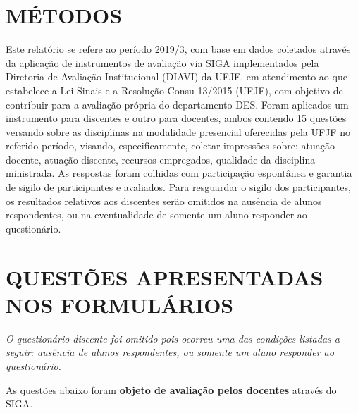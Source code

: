 \documentclass[a4paper,10pt]{article}
\begin{document}
\section{MÉTODOS}
Este relatório se refere ao período 2019/3, com base em dados     coletados através da aplicação de instrumentos de avaliação via SIGA     implementados pela Diretoria de Avaliação Institucional (DIAVI) da UFJF, em atendimento     ao que estabelece a Lei Sinais e a Resolução Consu 13/2015 (UFJF),     com objetivo de contribuir para a avaliação própria do departamento DES.    Foram aplicados um instrumento para discentes e outro para docentes, ambos contendo     15 questões versando sobre as disciplinas na modalidade presencial oferecidas pela UFJF no     referido período, visando, especificamente, coletar impressões sobre: atuação docente, atuação discente,     recursos empregados, qualidade da disciplina ministrada.     As respostas foram colhidas      com participação espontânea e garantia de    sigilo de participantes e avaliados. Para resguardar o sigilo dos participantes, os resultados relativos aos discentes serão omitidos na ausência de alunos respondentes, ou na eventualidade de somente um aluno responder ao questionário.
\section{QUESTÕES APRESENTADAS NOS FORMULÁRIOS}
{ \it O questionário discente foi omitido pois ocorreu uma das condições listadas a seguir: ausência de alunos respondentes, ou somente um aluno responder ao questionário.}

As questões abaixo foram {\bf objeto de avaliação pelos docentes} através do SIGA.
\end{document}

